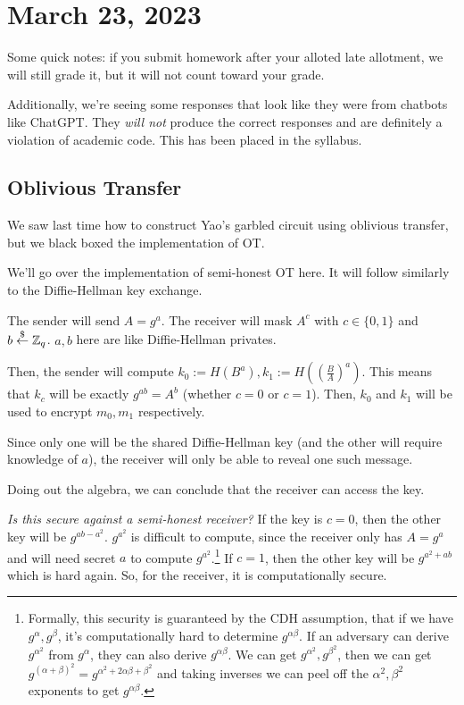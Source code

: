 \section{March 23, 2023}
\label{20230323}
Some quick notes: if you submit homework after your alloted late allotment, we will still grade it, but it will not count toward your grade.

Additionally, we're seeing some responses that look like they were from chatbots like ChatGPT. They \emph{will not} produce the correct responses and are definitely a violation of academic code. This has been placed in the syllabus.

\subsection{Oblivious Transfer}
We saw last time how to construct Yao's garbled circuit using oblivious transfer, but we black boxed the implementation of OT.

We'll go over the implementation of semi-honest OT here. It will follow similarly to the Diffie-Hellman key exchange.


The sender will send $A = g^a$. The receiver will mask $A^c$ with $c\in \{0,1\}$ and $b\overset{\$}{\leftarrow} \mathbb Z_q$. $a,b$ here are like Diffie-Hellman privates.

Then, the sender will compute $k_0 := H(B^a), k_1 := H\left( \left( \frac{B}{A} \right)^a \right)$. This means that $k_c$ will be exactly $g^{ab} = A^b$ (whether $c = 0$ or $c = 1$). Then, $k_0$ and $k_1$ will be used to encrypt $m_0, m_1$ respectively.

Since only one will be the shared Diffie-Hellman key (and the other will require knowledge of $a$), the receiver will only be able to reveal one such message.

Doing out the algebra, we can conclude that the receiver can access the key.

\emph{Is this secure against a semi-honest receiver?} If the key is $c = 0$, then the other key will be $g^{ab-a^2}$. $g^{a^2}$ is difficult to compute, since the receiver only has $A = g^a$ and will need secret $a$ to compute $g^{a^2}$.\footnote{Formally, this security is guaranteed by the CDH assumption, that if we have $g^{\alpha}, g^{\beta}$, it's computationally hard to determine $g^{\alpha\beta}$. If an adversary can derive $g^{\alpha^2}$ from $g^{\alpha}$, they can also derive $g^{\alpha\beta}$. We can get $g^{\alpha^2}, g^{\beta^2}$, then we can get $g^{(\alpha+\beta)^2}=g^{\alpha^2 + 2\alpha\beta + \beta^2}$ and taking inverses we can peel off the $\alpha^2,\beta^2$ exponents to get $g^{\alpha\beta}$.} If $c = 1$, then the other key will be $g^{a^2 + ab}$ which is hard again. So, for the receiver, it is computationally secure.

